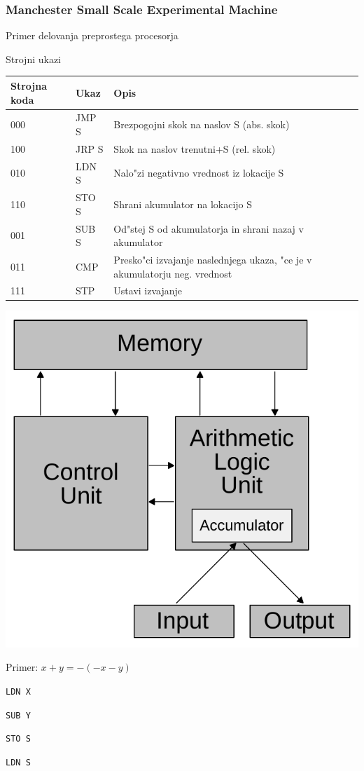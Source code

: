 \documentclass{beamer}
\begin{document}
\begin{frame}
\frametitle{Manchester Small Scale Experimental Machine}
Primer delovanja preprostega procesorja

\begin{block}{Strojni ukazi}
{\tiny
\begin{tabular}{l|l|l}
Strojna koda& Ukaz& Opis\\
\hline\hline
000& JMP S& Brezpogojni skok na naslov S (abs. skok)\\
100& JRP S& Skok na naslov trenutni+S (rel. skok)\\
010& LDN S& Nalo"zi negativno vrednost iz lokacije S\\
110& STO S& Shrani akumulator na lokacijo S\\
001& SUB S& Od"stej S od akumulatorja in shrani nazaj v akumulator\\
011& CMP & Presko"ci izvajanje naslednjega ukaza, "ce je v akumulatorju neg. vrednost\\
111& STP & Ustavi izvajanje\\
\hline\hline
\end{tabular}
}
\end{block}
\begin{minipage}{0.2\linewidth}
\includegraphics[width=\linewidth]{slike/Von_Neumann_architecture.pdf}
\end{minipage}%
\begin{minipage}{0.6\linewidth}
Primer: $ x+y = -(-x-y)$
\begin{center}
\texttt{LDN X}

\texttt{SUB Y}

\texttt{STO S}

\texttt{LDN S}
\end{center}
\end{minipage}
\end{frame}
\end{document}
